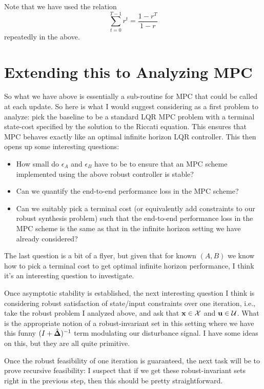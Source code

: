 \documentclass[11pt]{article}
\numberwithin{equation}{section}
\begin{document}
Note that we have used the relation
\begin{equation}
\sum_{t=0}^{T-1} r^t = \frac{1-r^T}{1-r}
\end{equation}
repeatedly in the above.

\section{Extending this to Analyzing MPC}
So what we have above is essentially a sub-routine for MPC that could be called at each update.  So here is what I would suggest considering as a first problem to analyze:  pick the baseline to be a standard LQR MPC problem with a terminal state-cost specified by the solution to the Riccati equation.  This ensures that MPC behaves exactly like an optimal infinite horizon LQR controller.  This then opens up some interesting questions:
\begin{itemize}
\item How small do $\epsilon_A$ and $\epsilon_B$ have to be to ensure that an MPC scheme implemented using the above robust controller is stable?
\item Can we quantify the end-to-end performance loss in the MPC scheme?
\item Can we suitably pick a terminal cost (or equivalently add constraints to our robust synthesis problem) such that the end-to-end performance loss in the MPC scheme is the same as that in the infinite horizon setting we have already considered?
\end{itemize}

The last question is a bit of a flyer, but given that for known $(A,B)$ we know how to pick a terminal cost to get optimal infinite horizon performance, I think it's an interesting question to investigate.

Once asymptotic stability is established, the next interesting question I think is considering robust satisfaction of state/input constraints over one iteration, i.e., take the robust problem I analyzed above, and ask that $\mathbf{x} \in \mathcal{X}$ and $\mathbf{u} \in \mathcal{U}$.  What is the appropriate notion of a robust-invariant set in this setting where we have this funny $(I+\hat{\mathbf{\Delta}})^{-1}$ term modulating our disturbance signal.  I have some ideas on this, but they are all quite primitive.

Once the robust feasibility of one iteration is guaranteed, the next task will be to prove recursive feasibility: I suspect that if we get these robust-invariant sets right in the previous step, then this should be pretty straightforward.
\end{document}
